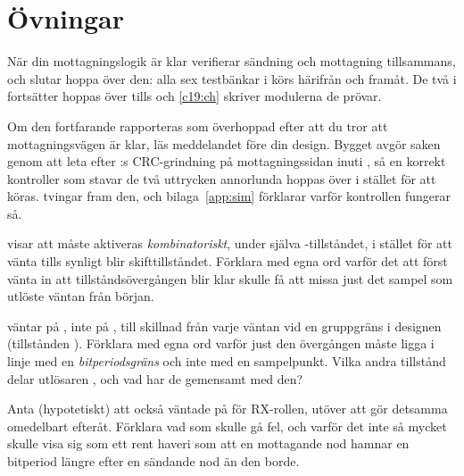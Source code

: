 
\section{Övningar}
\label{c17:sec:exercises}

\begin{aside}
När din mottagningslogik är klar verifierar  sändning och
mottagning tillsammans, och  slutar hoppa över den: alla sex testbänkar i
 körs härifrån och framåt. De två i  fortsätter hoppas över tills
 och \ref{c19:ch} skriver modulerna de prövar.

Om den fortfarande rapporteras som överhoppad efter att du tror att mottagningsvägen är klar, läs
meddelandet före din design. Bygget avgör saken genom att leta efter :s CRC-grindning
på mottagningssidan inuti , så en korrekt kontroller som stavar de två
uttrycken annorlunda hoppas över i stället för att köras. 
tvingar fram den, och bilaga~\ref{app:sim} förklarar varför kontrollen fungerar så.
\end{aside}

\label{c17:ex:timing}
  visar att  måste aktiveras
\emph{kombinatoriskt}, under själva -tillståndet, i stället för att vänta tills
 synligt blir skifttillståndet. Förklara med egna ord varför det att först vänta in att
tillståndsövergången blir klar skulle få  att missa just det sampel som utlöste
väntan från början.

  väntar på , inte på , till
skillnad från varje väntan vid en gruppgräns i designen (tillstånden ). Förklara
med egna ord varför just den övergången måste ligga i linje med en \emph{bitperiodsgräns} och inte
med en sampelpunkt. Vilka andra tillstånd delar utlösaren , och vad har de
gemensamt med den?

 Anta (hypotetiskt) att  också väntade på  för
RX-rollen, utöver att  gör detsamma omedelbart efteråt. Förklara vad som
skulle gå fel, och varför det inte så mycket skulle visa sig som ett rent haveri som att en mottagande
nod hamnar en bitperiod längre efter en sändande nod än den borde.

